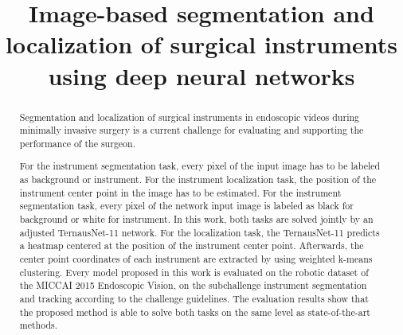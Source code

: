 \documentclass[conference]{IEEEtran}
\begin{document}
%
\title{Image-based segmentation and localization of surgical instruments using deep neural networks}


\author{
}




\maketitle

\begin{abstract}
Segmentation and localization of surgical instruments in endoscopic videos during minimally invasive surgery is a current challenge for evaluating and supporting the performance of the surgeon. 

For the instrument segmentation task, every pixel of the input image has to be labeled as background or instrument.
For the instrument localization task, the position of the instrument center point in the image has to be estimated.
For the instrument segmentation task, every pixel of the network input image is labeled as black for background or white for instrument.
In this work, both tasks are solved jointly by an adjusted TernausNet-11 network. For the localization task, the TernausNet-11 predicts a heatmap centered at the position of the instrument center point.
Afterwards, the center point coordinates of each instrument are extracted by using weighted k-means clustering. Every model proposed in this work is evaluated on the robotic dataset of the MICCAI 2015 Endoscopic Vision, on the subchallenge instrument segmentation and tracking according to the challenge guidelines. The evaluation results show that the proposed method is able to solve both tasks on the same level as state-of-the-art methods.
\end{abstract}
\end{document}
